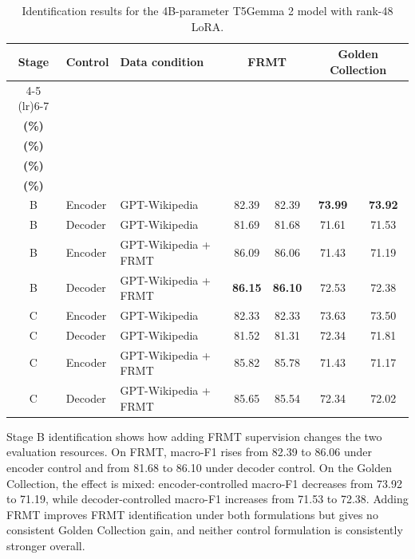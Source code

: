 \documentclass[acmtog,nonacm]{acmart}
\begin{document}
\begin{table}[tbp]
\centering
\small
\renewcommand{\arraystretch}{1.12}
\setlength{\tabcolsep}{5pt}
\caption{Identification results for the 4B-parameter T5Gemma 2 model with rank-48 LoRA.}
\label{tab:r48-classification-breakdown}
\begin{tabular}{@{}clp{5.1cm}cccc@{}}
\toprule
\textbf{Stage} & \textbf{Control} & \textbf{Data condition} &
\multicolumn{2}{c}{\textbf{FRMT}} &
\multicolumn{2}{c}{\textbf{Golden Collection}} \\
\cmidrule(lr){4-5} \cmidrule(lr){6-7}
& & & \shortstack{\textbf{Accuracy}\\\textbf{(\%)}}
& \shortstack{\textbf{Macro-F1}\\\textbf{(\%)}}
& \shortstack{\textbf{Accuracy}\\\textbf{(\%)}}
& \shortstack{\textbf{Macro-F1}\\\textbf{(\%)}} \\
\midrule
B & Encoder & GPT-Wikipedia & 82.39 & 82.39 & \textbf{73.99} & \textbf{73.92} \\
B & Decoder & GPT-Wikipedia & 81.69 & 81.68 & 71.61 & 71.53 \\
B & Encoder & GPT-Wikipedia + FRMT & 86.09 & 86.06 & 71.43 & 71.19 \\
B & Decoder & GPT-Wikipedia + FRMT & \textbf{86.15} & \textbf{86.10} & 72.53 & 72.38 \\
\midrule
C & Encoder & GPT-Wikipedia & 82.33 & 82.33 & 73.63 & 73.50 \\
C & Decoder & GPT-Wikipedia & 81.52 & 81.31 & 72.34 & 71.81 \\
C & Encoder & GPT-Wikipedia + FRMT & 85.82 & 85.78 & 71.43 & 71.17 \\
C & Decoder & GPT-Wikipedia + FRMT & 85.65 & 85.54 & 72.34 & 72.02 \\
\bottomrule
\end{tabular}
\end{table}

Stage B identification shows how adding FRMT supervision changes the
two evaluation resources. On FRMT, macro-F1 rises from 82.39 to 86.06 under
encoder control and from 81.68 to 86.10 under decoder control. On the Golden
Collection, the effect is mixed: encoder-controlled macro-F1 decreases from
73.92 to 71.19, while decoder-controlled macro-F1 increases from 71.53 to
72.38. Adding FRMT improves FRMT identification under both formulations but gives no consistent Golden Collection gain, and neither control formulation is consistently stronger overall.
\end{document}
